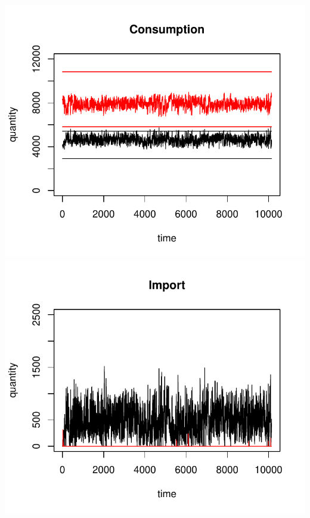 \documentclass{article}
\begin{document}
\vskip2mm
\hskip-1cm
\includegraphics[scale=0.5]{fig_case04_consumption}
\includegraphics[scale=0.5]{fig_case04_import}
\end{document}
